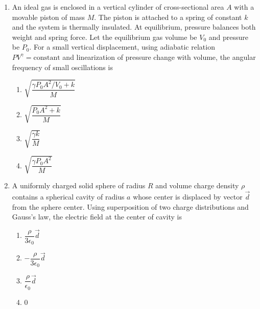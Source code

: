 \documentclass[12pt]{article}
\begin{document}
\begin{enumerate}[leftmargin=*]
\item An ideal gas is enclosed in a vertical cylinder of cross-sectional area $A$ with a movable piston of mass $M$. The piston is attached to a spring of constant $k$ and the system is thermally insulated. At equilibrium, pressure balances both weight and spring force. Let the equilibrium gas volume be $V_0$ and pressure be $P_0$. For a small vertical displacement, using adiabatic relation $PV^\gamma=\text{constant}$ and linearization of pressure change with volume, the angular frequency of small oscillations is

\begin{center}
\end{center}

\begin{enumerate}
\item $\sqrt{\dfrac{\gamma P_0 A^2/V_0 + k}{M}}$
\item $\sqrt{\dfrac{P_0 A^2 + k}{M}}$
\item $\sqrt{\dfrac{\gamma k}{M}}$
\item $\sqrt{\dfrac{\gamma P_0 A^2}{M}}$
\end{enumerate}

\item A uniformly charged solid sphere of radius $R$ and volume charge density $\rho$ contains a spherical cavity of radius $a$ whose center is displaced by vector $\vec{d}$ from the sphere center. Using superposition of two charge distributions and Gauss’s law, the electric field at the center of cavity is

\begin{center}
\end{center}

\begin{enumerate}
\item $\dfrac{\rho}{3\epsilon_0}\vec{d}$
\item $-\dfrac{\rho}{3\epsilon_0}\vec{d}$
\item $\dfrac{\rho}{\epsilon_0}\vec{d}$
\item $0$
\end{enumerate}


\end{enumerate}
\end{document}
